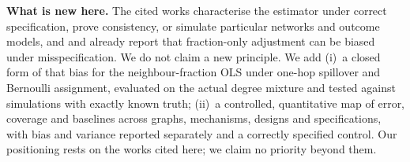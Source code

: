 \textbf{What is new here.}
The cited works characterise the estimator under correct specification, prove consistency, or simulate particular networks and outcome models, and \citet{chin2019} and \citet{hanugander2023} already report that fraction-only adjustment can be biased under misspecification. We do not claim a new principle. We add (i)~a closed form of that bias for the neighbour-fraction OLS under one-hop spillover and Bernoulli assignment, evaluated on the actual degree mixture and tested against simulations with exactly known truth; (ii)~a controlled, quantitative map of error, coverage and baselines across graphs, mechanisms, designs and specifications, with bias and variance reported separately and a correctly specified control. Our positioning rests on the works cited here; we claim no priority beyond them.

